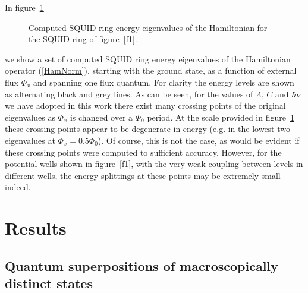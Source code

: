 \documentclass[12pt,a4paper,superscriptaddress,showpacs,floatfix,pra]{revtex4-2}
\begin{document}
In figure~\ref{f2} 
\begin{figure}[!t]
\begin{center}
\end{center}
\caption{Computed SQUID ring energy eigenvalues of the Hamiltonian for the
SQUID ring of figure~\protect\ref{f1}. }
\label{f2}
\end{figure}
we  show  a set  of  computed SQUID  ring  energy  eigenvalues of  the
Hamiltonian operator (\ref{HamNorm}),  starting with the ground state,
as  a function  of external  flux $\Phi  _{x}$ and  spanning  one flux
quantum. For clarity the energy  levels are shown as alternating black
and grey lines. As can be seen,  for the values of $\Lambda $, $C$ and
$\hbar \nu  $ we have adopted  in this work there  exist many crossing
points of  the original eigenvalues as  $\Phi _{x}$ is  changed over a
$\Phi  _{0}$ period. At  the scale  provided in  figure~\ref{f2} these
crossing points appear to be  degenerate in energy (e.g. in the lowest
two eigenvalues at  $\Phi _{x}=0.5\Phi _{0}$). Of course,  this is not
the case, as  would be evident if these  crossing points were computed
to  sufficient accuracy.  However, for  the potential  wells  shown in
figure~\ref{f1},  with  the  very  weak  coupling  between  levels  in
different  wells,  the  energy  splittings  at  these  points  may  be
extremely small indeed.

\section{Results}

\subsection{Quantum superpositions of macroscopically distinct states}
\end{document}
